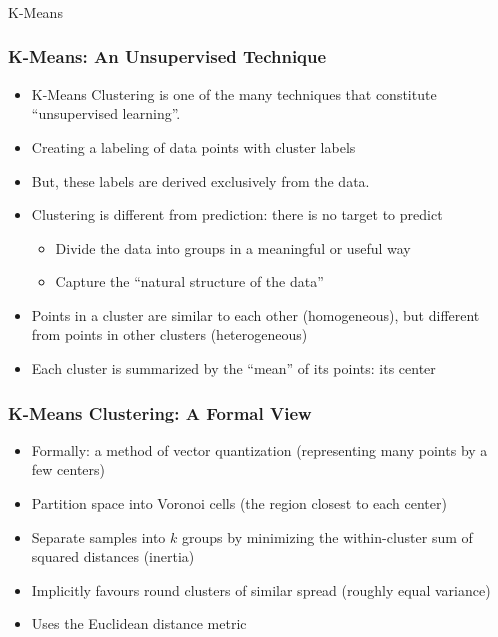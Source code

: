

\begin{frame}[fragile]\frametitle{}
\begin{center}
{\Large K-Means}
\end{center}
\end{frame}


\begin{frame}[fragile]\frametitle{K-Means: An Unsupervised Technique}
\begin{itemize}
\item K-Means Clustering is one of the many techniques that constitute ``unsupervised learning''.
\item Creating a labeling of data points with cluster labels
\item But, these labels are derived exclusively from the data.
\item Clustering is different from prediction: there is no target to predict
\begin{itemize}
\item Divide the data into groups in a meaningful or useful way
\item Capture the ``natural structure of the data''
\end{itemize}
\item Points in a cluster are similar to each other (homogeneous), but different from points in other clusters (heterogeneous)
\item Each cluster is summarized by the ``mean'' of its points: its center
\end{itemize}
\end{frame}

\begin{frame}[fragile]\frametitle{K-Means Clustering: A Formal View}
\begin{itemize}
\item Formally: a method of vector quantization (representing many points by a few centers)
\item Partition space into Voronoi cells (the region closest to each center)
\item Separate samples into $k$ groups by minimizing the within-cluster sum of squared distances (inertia)
\item Implicitly favours round clusters of similar spread (roughly equal variance)
\item Uses the Euclidean distance metric
\end{itemize}
\end{frame}

